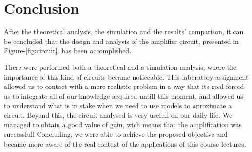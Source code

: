 \section{Conclusion}
\label{sec:conclusion}

After the theoretical analysis, the simulation and the results' comparison, it can be
concluded that the design and analysis of the amplifier circuit, presented in Figure-\ref{fig:circuit}, has been accomplished.\par

There were performed both a theoretical and a simulation analysis, where the importance of this kind of circuits became noticeable. This laboratory assignment allowed us to contact with a more realistic problem in a way that its goal forced us to integrate all of our knowledge acquired untill this moment, and allowed us to understand what is in stake when we need to use models to aproximate a circuit. Beyond this, the circuit analysed is very usefull on our daily life.
We managed to obtain a good value of gain, wich means that the amplification was successfull
Concluding, we were able to achieve the proposed objective and became more aware of the real context of the applications of this course lectures.
